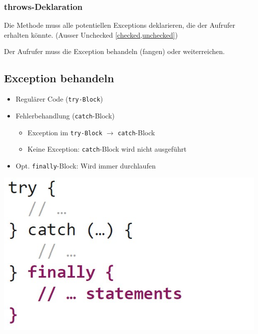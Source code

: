 \subsubsection{throws-Deklaration}
Die Methode muss alle potentiellen Exceptions deklarieren, die der Aufrufer erhalten könnte. (Ausser Unchecked \ref{checked,unchecked})

Der Aufrufer muss die Exception behandeln (fangen) oder weiterreichen.

\subsection{Exception behandeln}
\begin{minipage}{0.6\columnwidth}
    \begin{itemize}
        \itemsep0em
        \item Regulärer Code (\verb|try-Block|)
        \item Fehlerbehandlung (\verb|catch|-Block)
        \begin{itemize}
            \itemsep0em
            \item Exception im \verb|try-Block| $\rightarrow$ \verb|catch|-Block
            \item Keine Exception: \verb|catch|-Block wird nicht ausgeführt
        \end{itemize}
        \item Opt. \verb|finally|-Block: Wird immer durchlaufen
    \end{itemize}
\end{minipage}
\hfill
\begin{minipage}{0.35\columnwidth}
    \includegraphics[width=\linewidth]{pictures/try-catch-finally.jpg}
\end{minipage}

